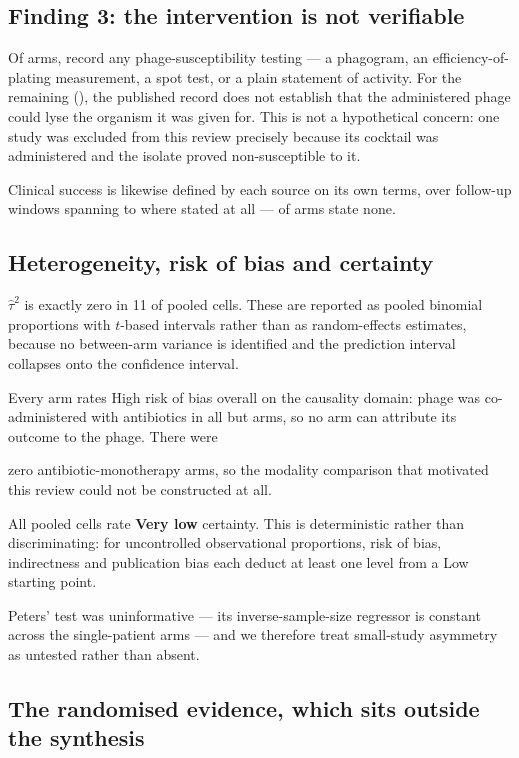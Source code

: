 \documentclass[12pt]{article}
\begin{document}
\subsection*{Finding 3: the intervention is not verifiable}

Of \PhageSuscArms arms, \PhageSuscDocumented record any phage-susceptibility testing --- a phagogram, an efficiency-of-plating measurement, a spot test, or a plain statement of activity. For the remaining \PhageSuscSilent (\PhageSuscSilentPct), the published record does not establish that the administered phage could lyse the organism it was given for. This is not a hypothetical concern: one study was excluded from this review precisely because its cocktail was administered and the isolate proved non-susceptible to it.

Clinical success is likewise defined by each source on its own terms, over follow-up windows spanning \FollowUpMin{} to \FollowUpMax{} where stated at all --- \FollowUpNotStated of \ArmsAnalysed arms state none.

\subsection*{Heterogeneity, risk of bias and certainty}

$\hat\tau^2$ is exactly zero in 11 of \CellsPooled pooled cells. These are reported as pooled binomial proportions with $t$-based intervals rather than as random-effects estimates, because no between-arm variance is identified and the prediction interval collapses onto the confidence interval.

Every arm rates High risk of bias overall on the causality domain: phage was co-administered with antibiotics in all but \ModalityMonoArms arms, so no arm can attribute its outcome to the phage. There were \strut zero antibiotic-monotherapy arms, so the modality comparison that motivated this review could not be constructed at all.

All \CellsPooled pooled cells rate \textbf{Very low} certainty. This is deterministic rather than discriminating: for uncontrolled observational proportions, risk of bias, indirectness and publication bias each deduct at least one level from a Low starting point.

Peters' test was uninformative --- its inverse-sample-size regressor is constant across the single-patient arms --- and we therefore treat small-study asymmetry as untested rather than absent.

\subsection*{The randomised evidence, which sits outside the synthesis}
\end{document}
